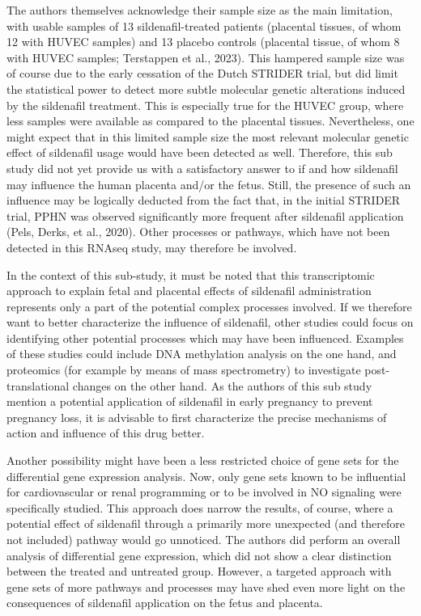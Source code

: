 \documentclass[authordate, reflection,issue]{jote-new-article}
\begin{document}
	The authors themselves acknowledge their sample size as the main limitation, with usable samples of 13 sildenafil-treated patients (placental tissues, of whom 12 with HUVEC samples) and 13 placebo controls (placental tissue, of whom 8 with HUVEC samples; Terstappen et al., 2023). This hampered sample size was of course due to the early cessation of the Dutch STRIDER trial, but did limit the statistical power to detect more subtle molecular genetic alterations induced by the sildenafil treatment. This is especially true for the HUVEC group, where less samples were available as compared to the placental tissues. Nevertheless, one might expect that in this limited sample size the most relevant molecular genetic effect of sildenafil usage would have been detected as well. Therefore, this sub study did not yet provide us with a satisfactory answer to if and how sildenafil may influence the human placenta and/or the fetus. Still, the presence of such an influence may be logically deducted from the fact that, in the initial STRIDER trial, PPHN was observed significantly more frequent after sildenafil application (Pels, Derks, et al., 2020). Other processes or pathways, which have not been detected in this RNAseq study, may therefore be involved.



	In the context of this sub-study, it must be noted that this transcriptomic approach to explain fetal and placental effects of sildenafil administration represents only a part of the potential complex processes involved. If we therefore want to better characterize the influence of sildenafil, other studies could focus on identifying other potential processes which may have been influenced. Examples of these studies could include DNA methylation analysis on the one hand, and proteomics (for example by means of mass spectrometry) to investigate post-translational changes on the other hand. As the authors of this sub study mention a potential application of sildenafil in early pregnancy to prevent pregnancy loss, it is advisable to first characterize the precise mechanisms of action and influence of this drug better.



	Another possibility might have been a less restricted choice of gene sets for the differential gene expression analysis. Now, only gene sets known to be influential for cardiovascular or renal programming or to be involved in NO signaling were specifically studied. This approach does narrow the results, of course, where a potential effect of sildenafil through a primarily more unexpected (and therefore not included) pathway would go unnoticed. The authors did perform an overall analysis of differential gene expression, which did not show a clear distinction between the treated and untreated group. However, a targeted approach with gene sets of more pathways and processes may have shed even more light on the consequences of sildenafil application on the fetus and placenta.
\end{document}
